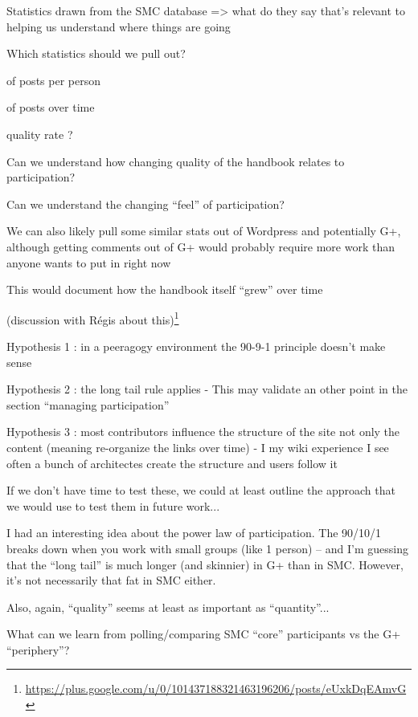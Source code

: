 \documentclass{acm_proc_article-sp}
\begin{document}
    Statistics drawn from the SMC database => what do they say that's relevant to helping us understand where things are going

        Which statistics should we pull out?

             of posts per person

             of posts over time

             quality rate ?

                Can we understand how changing quality of the handbook relates to participation?

                Can we understand the changing ``feel'' of participation?

        We can also likely pull some similar stats out of Wordpress and potentially G+, although getting comments out of G+ would probably require more work than anyone wants to put in right now

            This would document how the handbook itself ``grew'' over time

            (discussion with R\'egis about this)\footnote{\url{https://plus.google.com/u/0/101437188321463196206/posts/eUxkDqEAmvG}}

                Hypothesis 1 : in a peeragogy environment the 90-9-1 principle doesn't make sense

                Hypothesis 2 : the long tail rule applies - This may validate an other point in the section ``managing participation''

                Hypothesis 3 : most contributors influence the structure of the site not only the content (meaning re-organize the links over time) - I my wiki experience I see often a bunch of architectes create the structure and users follow it

            If we don't have time to test these, we could at least outline the approach that we would use to test them in future work...

        I had an interesting idea about the power law of participation. The 90/10/1 breaks down when you work with small groups (like 1 person) -- and I'm guessing that the ``long tail'' is much longer (and skinnier) in G+ than in SMC. However, it's not necessarily that fat in SMC either.

        Also, again, ``quality'' seems at least as important as ``quantity''... 

    What can we learn from polling/comparing SMC ``core'' participants vs the G+ ``periphery''?
\end{document}

